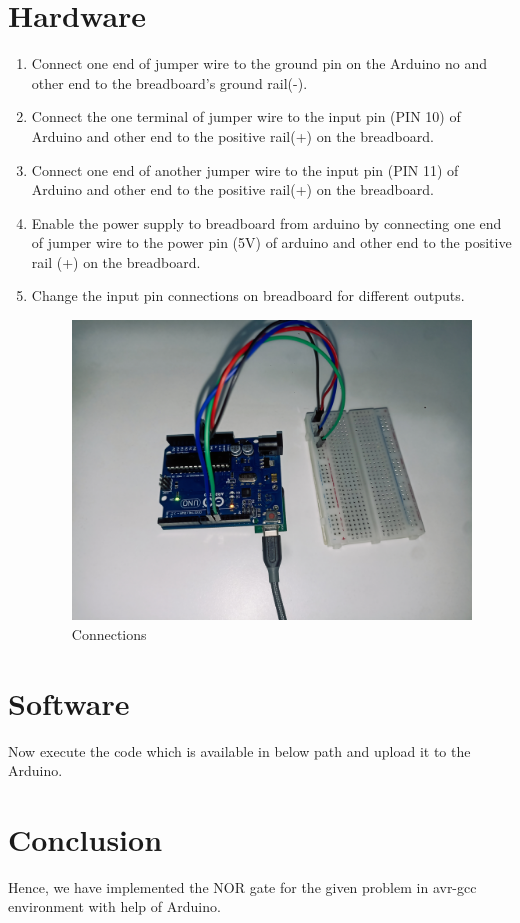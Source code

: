\documentclass[10pt,a4paper]{article}
\begin{document}
\section{Hardware}
\begin{enumerate}
	\item Connect one end of jumper wire to the ground pin on the Arduino no and other end to the breadboard's ground rail(-).
	\item Connect the one terminal of jumper wire to the input pin (PIN 10) of Arduino and other end to the positive rail(+) on the breadboard.
	\item Connect one end of another jumper wire to the input pin (PIN 11) of Arduino and other end to the positive rail(+) on the breadboard.
	\item Enable the power supply to breadboard from arduino by connecting one end of jumper wire to the power pin (5V) of arduino and other end to the positive rail (+) on the breadboard.
	\item Change the input pin connections on breadboard for different outputs.
		\begin{figure}[h!]
			\centering
			\includegraphics[width=0.3\columnwidth]{avrgcc.jpg}
			\caption{Connections}
			\label{fig:connections}
		\end{figure}
\end{enumerate}
\section{Software}
Now execute the code which is available in below path and upload it to the Arduino. \\
\section{Conclusion}
Hence, we have implemented the NOR gate for the given problem in avr-gcc environment with help of Arduino.
\end{document}
